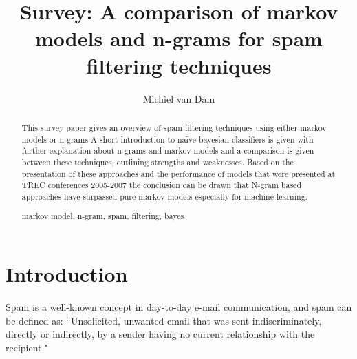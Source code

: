 \documentclass[runningheads,a4paper]{llncs}
\newcommand{\keywords}[1]{\par\addvspace\baselineskip
\noindent\keywordname\enspace\ignorespaces#1}
\begin{document}
\mainmatter  %

\title{Survey: A comparison of markov models and n-grams for spam filtering techniques}


%
%
\author{Michiel van Dam}
%


%
%

\maketitle

\begin{abstract}
This survey paper gives an overview of spam filtering techniques using either markov 
models or n-grams A short introduction to na\"ive bayesian classifiers is given with 
further explanation about n-grams and markov models and a comparison is given between
these techniques, outlining strengths and weaknesses. Based on the presentation of these
approaches and the performance of models that were presented at TREC conferences 2005-2007
the conclusion can be drawn that N-gram based approaches have surpassed pure markov
models especially for machine learning.
\keywords{markov model, n-gram, spam, filtering, bayes}
\end{abstract}

\section{Introduction}
Spam is a well-known concept in day-to-day e-mail communication, and spam can be 
defined as: ``Unsolicited, unwanted email that was sent indiscriminately, directly 
or indirectly, by a sender having no current relationship with the recipient."\cite{2005overview}
\end{document}
